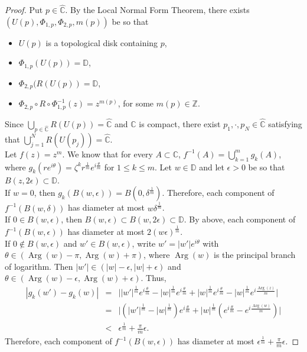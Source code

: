 \documentclass[11pt,letterpaper]{article}
\theoremstyle{definition}
\def\Arg{\operatorname{Arg}}
\begin{document}
\begin{proof}
Put $p\in\widehat{\mathbb{C}}$. By the Local Normal Form Theorem, there exists $(U(p),\Phi_{1,p},\Phi_{2,p},m(p))$ be so that 
\begin{itemize}
\item $U(p)$ is a topological disk containing $p$,
\item $\Phi_{1,p}(U(p))=\mathbb{D}$,
\item $\Phi_{2,p}(R(U(p))=\mathbb{D}$,
\item $\Phi_{2,p}\circ R\circ \Phi_{1,p}^{-1}(z)=z^{m(p)}$, for some $m(p)\in\mathbb{Z}$.
\end{itemize}
Since $\bigcup_{p\in\widehat{\mathbb{C}}}R(U(p))=\widehat{\mathbb{C}}$ and $\widehat{\mathbb{C}}$ is compact, there exist $p_1,\cdot,p_N\in\widehat{\mathbb{C}}$ satisfying that $\bigcup_{j=1}^N R(U(p_j))=\widehat{\mathbb{C}}$.
\\

Let $f(z)=z^m$. We know that for every $A\subset\mathbb{C}$, $f^{-1}(A)=\bigcup_{k=1}^{m}g_k(A)$, where $g_k(re^{i\theta})=\zeta^kr^{\frac{1}{m}}e^{i\frac{\theta}{m}}$ for $1\leq k\leq m$. 
Let $w\in\mathbb{D}$ and let $\epsilon>0$ be so that $B(z,2\epsilon)\subset\mathbb{D}$. 
\\

If $w=0$, then $g_k(B(w,\epsilon))=B(0,\delta^{\frac{1}{m}})$. Therefore, each component of $f^{-1}(B(w,\delta))$ has diameter at most $w\delta^{\frac{1}{m}}$.
\\

If $0\in B(w,\epsilon)$, then $B(w,\epsilon)\subset B(w,2\epsilon)\subset\mathbb{D}$. By above, each component of $f^{-1}(B(w,\epsilon))$ has diameter at most $2(w\epsilon)^{\frac{1}{m}}$.
\\

If $0\notin B(w,\epsilon)$ and $w'\in B(w,\epsilon)$, write $w'=|w'|e^{i\theta}$ with $\theta\in (\Arg(w)-\pi,\Arg(w)+\pi)$, where $\Arg(w)$ is the principal branch of logarithm. Then $|w'|\in(|w|-\epsilon,|w|+\epsilon)$ and $\theta\in(\Arg(w)-\epsilon,\Arg(w)+\epsilon)$. Thus,
\begin{eqnarray*}
|g_k(w')-g_k(w)|&=&\big| |w'|^{\frac{1}{m}}e^{i\frac{\theta}{m}}-|w|^{\frac{1}{m}}e^{i\frac{\theta}{m}}+|w|^{\frac{1}{m}}e^{i\frac{\theta}{m}}-|w|^{\frac{1}{m}}e^{i\frac{\Arg(z)}{m}} \big|\\
&=&\big| (|w'|^{\frac{1}{m}}-|w|^{\frac{1}{m}})e^{i\frac{\theta}{m}}+|w|^{\frac{1}{m}}(e^{i\frac{\theta}{m}}-e^{i\frac{\Arg(w)}{m}}) \big|\\
&<&\epsilon^{\frac{1}{m}}+\frac{\pi}{m}\epsilon.
\end{eqnarray*}
Therefore, each component of $f^{-1}(B(w,\epsilon))$ has diameter at most $\epsilon^{\frac{1}{m}}+\frac{\pi}{m}\epsilon$.


\end{proof}
\end{document}
